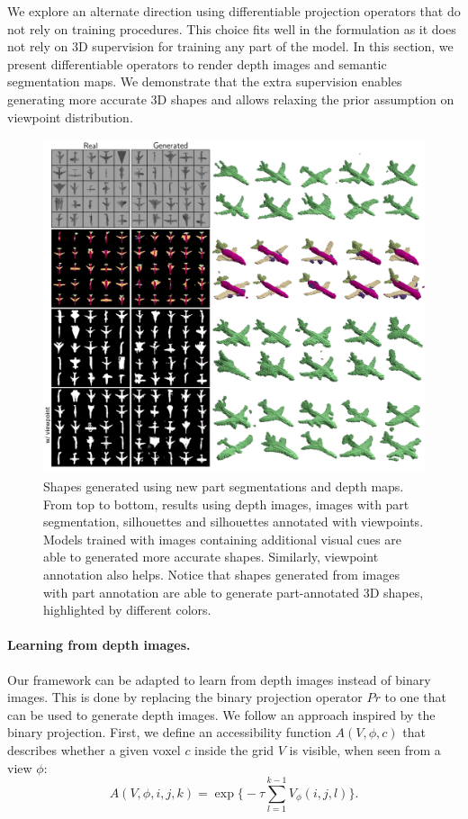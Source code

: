 We explore an alternate direction using differentiable projection
operators that do not rely on training procedures.
This choice fits well in the \prgan formulation as it does not
rely on 3D supervision for training any part of the model.
In this section, we present differentiable operators to render
depth images and semantic segmentation maps.
We demonstrate that the extra supervision enables generating more
accurate 3D shapes and allows relaxing the prior assumption
on viewpoint distribution.

\begin{figure}[t]
\centering
\includegraphics[width=\linewidth]{prgan/fig/new/newprojs.pdf}
\caption{\label{fig:newprojs} Shapes generated using new part segmentations and depth maps.
	From top to bottom, results using depth images, images with part segmentation, silhouettes and silhouettes annotated with viewpoints.
	Models trained with images containing additional visual cues are able to generated more accurate shapes. 
	Similarly, viewpoint annotation also helps.
	Notice that shapes generated from images with part annotation are able to generate part-annotated 3D shapes, highlighted by different colors.}
\end{figure}

\paragraph*{Learning from depth images.}
Our framework can be adapted to learn from depth images instead of binary images.
This is done by replacing the binary projection operator $Pr$ to one that can be used to generate
depth images.
We follow an approach inspired by the binary projection.
First, we define an accessibility function $A(V, \phi, c)$ that describes whether a given voxel $c$ inside the grid $V$ is visible, 
when seen from a view $\phi$:
\begin{equation}
A(V, \phi, i, j, k) = \exp\bigg\{-\tau \sum_{l=1}^{k-1} V_\phi(i,j,l) \bigg\}.
\end{equation}

